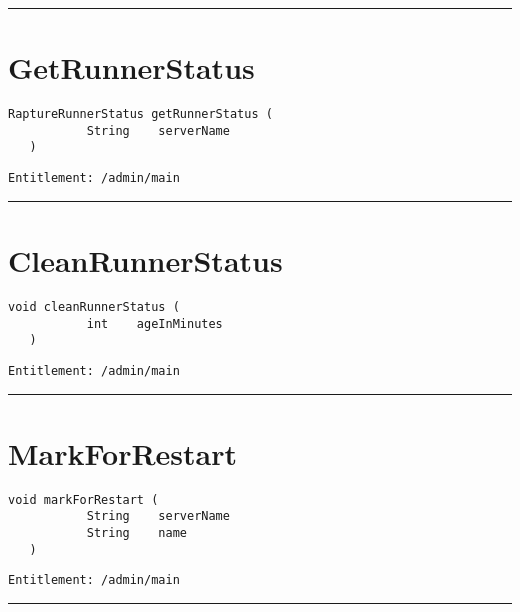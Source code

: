 \rule{12cm}{2pt}
\section{GetRunnerStatus}
\label{Api:GetRunnerStatus}
\begin{lstlisting}[style=nonumbers]
   RaptureRunnerStatus getRunnerStatus (
           String    serverName
   )
\end{lstlisting}
\begin{Verbatim}[formatcom=\color{Maroon}]
  Entitlement: /admin/main
\end{Verbatim}



\rule{12cm}{2pt}
\section{CleanRunnerStatus}
\label{Api:CleanRunnerStatus}
\begin{lstlisting}[style=nonumbers]
   void cleanRunnerStatus (
           int    ageInMinutes
   )
\end{lstlisting}
\begin{Verbatim}[formatcom=\color{Maroon}]
  Entitlement: /admin/main
\end{Verbatim}



\rule{12cm}{2pt}
\section{MarkForRestart}
\label{Api:MarkForRestart}
\begin{lstlisting}[style=nonumbers]
   void markForRestart (
           String    serverName
           String    name
   )
\end{lstlisting}
\begin{Verbatim}[formatcom=\color{Maroon}]
  Entitlement: /admin/main
\end{Verbatim}



\rule{12cm}{2pt}

